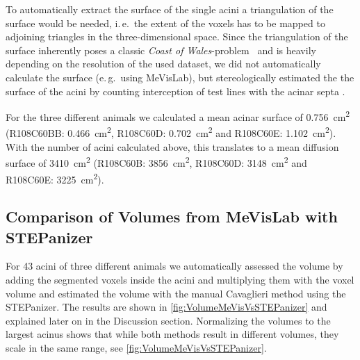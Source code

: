 \documentclass[twoside,paper=a4,abstract=true,english,DIV=calc]{scrartcl}
\newcommand{\ie}{i.\,e.\ }
\newcommand{\eg}{e.\,g.\ }
\newcommand{\numberofacini}{43}
\begin{document}
%
%
To automatically extract the surface of the single acini a triangulation of the surface would be needed, \ie the extent of the voxels has to be mapped to adjoining triangles in the three-dimensional space. Since the triangulation of the surface inherently poses a classic \emph{Coast of Wales}-problem~\cite{Mandelbrot1967a} and is heavily depending on the resolution of the used dataset, we did not automatically calculate the surface (\eg using MeVisLab), but stereologically estimated the the surface of the acini by counting interception of test lines with the acinar septa \cite{Hsia2010}.

For the three different animals we calculated a mean acinar surface of \SI{0.756}{\centi\metre\squared} (R108C60BB: \SI{0.466}{\centi\metre\squared}, R108C60D: \SI{0.702}{\centi\metre\squared} and R108C60E: \SI{1.102}{\centi\metre\squared}). With the number of acini calculated above, this translates to a mean diffusion surface of \SI{3410}{\centi\metre\squared} (R108C60B: \SI{3856}{\centi\metre\squared}, R108C60D: \SI{3148}{\centi\metre\squared} and R108C60E: \SI{3225}{\centi\metre\squared}).

\subsection{Comparison of Volumes from MeVisLab with STEPanizer}
For \numberofacini\xspace acini of three different animals we automatically assessed the volume by adding the segmented voxels inside the acini and multiplying them with the voxel volume and estimated the volume with the manual Cavaglieri method \cite{Hsia2010} using the STEPanizer. The results are shown in \autoref{fig:VolumeMeVisVsSTEPanizer} and explained later on in the Discussion section. Normalizing the volumes to the largest acinus shows that while both methods result in different volumes, they scale in the same range, see \autoref{fig:VolumeMeVisVsSTEPanizer}.
\end{document}
